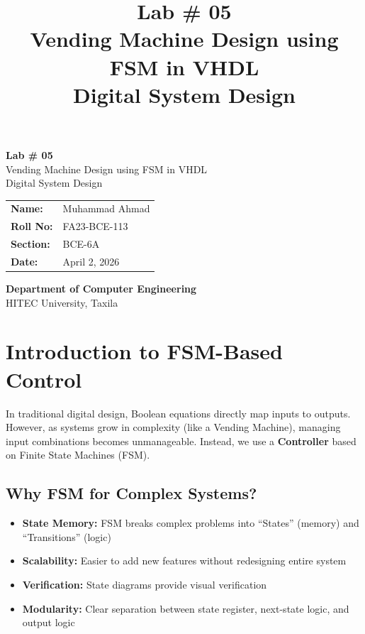 \documentclass[12pt,a4paper]{article}
\title{\textbf{Lab \# 05}\\[0.5cm]
\Large Vending Machine Design using FSM in VHDL\\[1cm]
\large Digital System Design}
\author{}
\date{}
\begin{document}
\begin{titlepage}
    \centering
    \vspace*{2cm}
    
    {\Huge\textbf{Lab \# 05}}\\[0.5cm]
    {\Large Vending Machine Design using FSM in VHDL}\\[0.3cm]
    {\large Digital System Design}\\[2cm]
    
    \begin{tabular}{ll}
        \textbf{Name:} & Muhammad Ahmad \\
        \textbf{Roll No:} & FA23-BCE-113 \\
        \textbf{Section:} & BCE-6A \\
        \textbf{Date:} & April 2, 2026 \\
    \end{tabular}
    
    \vfill
    
    \textbf{Department of Computer Engineering}\\
    HITEC University, Taxila
    
\end{titlepage}

\tableofcontents
\newpage

\section{Introduction to FSM-Based Control}

In traditional digital design, Boolean equations directly map inputs to outputs. However, as systems grow in complexity (like a Vending Machine), managing input combinations becomes unmanageable. Instead, we use a \textbf{Controller} based on Finite State Machines (FSM).

\subsection{Why FSM for Complex Systems?}

\begin{itemize}
    \item \textbf{State Memory:} FSM breaks complex problems into ``States'' (memory) and ``Transitions'' (logic)
    \item \textbf{Scalability:} Easier to add new features without redesigning entire system
    \item \textbf{Verification:} State diagrams provide visual verification
    \item \textbf{Modularity:} Clear separation between state register, next-state logic, and output logic
\end{itemize}
\end{document}
